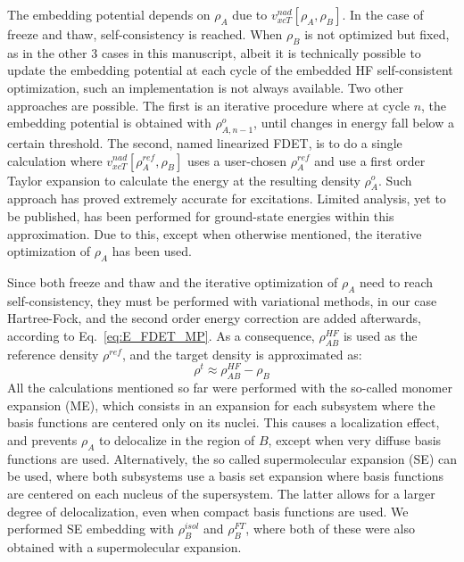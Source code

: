 \documentclass[journal=jctcce,manuscript=article, layout=twocolumn]{achemso}
\begin{document}
The embedding potential depends on $\rho_A$ due to $v_{xcT}^{nad}[\rho_A, \rho_B]$. In the case of freeze and thaw, self-consistency is reached. When $\rho_B$ is not optimized but fixed, as in the other 3 cases in this manuscript, albeit it is technically possible to update the embedding potential at each cycle of the embedded HF self-consistent optimization\cite{Dulak2009}, such an implementation is not always available. Two other approaches are possible.  The first is an iterative procedure where at cycle $n$, the embedding potential is obtained with $\rho^{o}_{A,n-1}$, until changes in energy fall below a certain threshold. The second, named linearized FDET, is to do a single calculation where $v_{xcT}^{nad}[\rho^{ref}_A, \rho_B]$ uses a user-chosen $\rho^{ref}_A$ and use a first order Taylor expansion to calculate the energy at the resulting density $\rho^{o}_A$. Such approach has proved extremely accurate for excitations\cite{Zech2015}. Limited analysis, yet to be published, has been performed for ground-state energies within this approximation. Due to this, except when otherwise mentioned, the iterative optimization of $\rho_A$ has been used.

Since both freeze and thaw and the iterative optimization of $\rho_A$ need to reach self-consistency, they must be performed with variational methods, in our case Hartree-Fock, and the second order energy correction are added afterwards, according to Eq.~\ref{eq:E_FDET_MP}. As a consequence, $\rho_{AB}^{HF}$ is used as the reference density $\rho^{ref}$, and the target density is approximated as:
\begin{equation}
 \rho^t \approx \rho_{AB}^{HF} - \rho_B
\end{equation}
All the calculations mentioned so far were performed with the so-called monomer expansion (ME), which consists in an expansion for each subsystem where the basis functions are centered only on its nuclei. This causes a localization effect, and prevents $\rho_A$ to delocalize in the region of $B$, except when very diffuse basis functions are used.
Alternatively, the so called supermolecular expansion (SE) can be used, where both subsystems use a basis set expansion where basis functions are centered on each nucleus of the supersystem. The latter allows for a larger degree of delocalization, even when compact basis functions are used. We performed SE embedding with $\rho_B^{isol}$ and $\rho_B^{FT}$, where both of these were also obtained with a supermolecular expansion.
\end{document}
